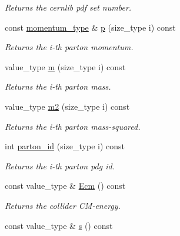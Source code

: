 \begin{DoxyCompactItemize}
\begin{DoxyCompactList}\small\item\em Returns the cernlib pdf set number. \end{DoxyCompactList}\item 
\hypertarget{a00308_ab75f2fa9fd1e30dbf7771090aba0cde7}{}const \hyperlink{a00579}{momentum\+\_\+type} \& \hyperlink{a00308_ab75f2fa9fd1e30dbf7771090aba0cde7}{p} (size\+\_\+type i) const \label{a00308_ab75f2fa9fd1e30dbf7771090aba0cde7}

\begin{DoxyCompactList}\small\item\em Returns the i-\/th parton momentum. \end{DoxyCompactList}\item 
\hypertarget{a00308_a2a95cea4e7fd1e59bf96fed7225afdf2}{}value\+\_\+type \hyperlink{a00308_a2a95cea4e7fd1e59bf96fed7225afdf2}{m} (size\+\_\+type i) const \label{a00308_a2a95cea4e7fd1e59bf96fed7225afdf2}

\begin{DoxyCompactList}\small\item\em Returns the i-\/th parton mass. \end{DoxyCompactList}\item 
\hypertarget{a00308_a70734e64cb54bccffc222d30d2bf390f}{}value\+\_\+type \hyperlink{a00308_a70734e64cb54bccffc222d30d2bf390f}{m2} (size\+\_\+type i) const \label{a00308_a70734e64cb54bccffc222d30d2bf390f}

\begin{DoxyCompactList}\small\item\em Returns the i-\/th parton mass-\/squared. \end{DoxyCompactList}\item 
\hypertarget{a00308_a12b501200a00862519c4ce1cd28c47e0}{}int \hyperlink{a00308_a12b501200a00862519c4ce1cd28c47e0}{parton\+\_\+id} (size\+\_\+type i) const \label{a00308_a12b501200a00862519c4ce1cd28c47e0}

\begin{DoxyCompactList}\small\item\em Returns the i-\/th parton pdg id. \end{DoxyCompactList}\item 
\hypertarget{a00308_a1c44f2d8ae296992dabfe40a333ffde7}{}const value\+\_\+type \& \hyperlink{a00308_a1c44f2d8ae296992dabfe40a333ffde7}{Ecm} () const \label{a00308_a1c44f2d8ae296992dabfe40a333ffde7}

\begin{DoxyCompactList}\small\item\em Returns the collider C\+M-\/energy. \end{DoxyCompactList}\item 
\hypertarget{a00308_ae2984255cbdaabc293b8168d93c767bf}{}const value\+\_\+type \& \hyperlink{a00308_ae2984255cbdaabc293b8168d93c767bf}{s} () const \label{a00308_ae2984255cbdaabc293b8168d93c767bf}


\end{DoxyCompactItemize}

